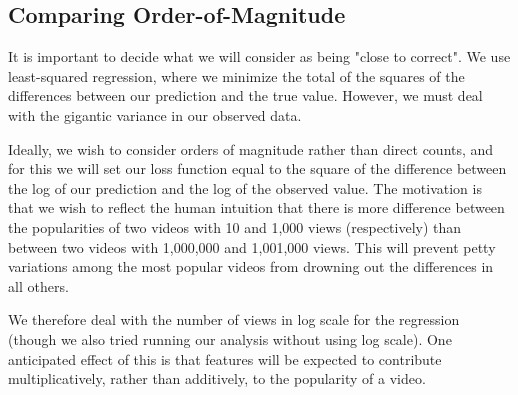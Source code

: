 \subsection{Comparing Order-of-Magnitude}
\label{sec:orderofmagnitude}
	It is important to decide what we will consider as being "close to correct".  We use least-squared regression, where we minimize the total of the squares of the differences between our prediction and the true value.  However, we must deal with the gigantic variance in our observed data.

	Ideally, we wish to consider orders of magnitude rather than direct counts, and for this we will set our loss function equal to the square of the difference between the log of our prediction and the log of the observed value.  The motivation is that we wish to reflect the human intuition that there is more difference between the popularities of two videos with 10 and 1,000 views (respectively) than between two videos with 1,000,000 and 1,001,000 views.  This will prevent petty variations among the most popular videos from drowning out the differences in all others.

	We therefore deal with the number of views in log scale for the regression (though we also tried running our analysis without using log scale).  One anticipated effect of this is that features will be expected to contribute multiplicatively, rather than additively, to the popularity of a video.
